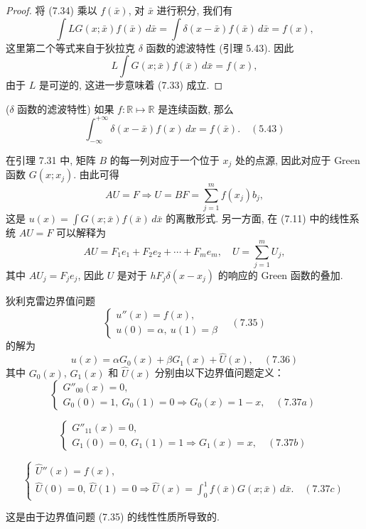 \documentclass[a4paper]{ctexart}
\newcommand{\hl}[1]
{\noindent {\bf {#1}}}
\begin{document}
{\begin{proof}
将 (7.34) 乘以 $f(\bar{x})$, 对 $\bar{x}$ 进行积分, 我们有
$$
\int LG(x; \bar{x})f(\bar{x}) \, d\bar{x} 
= \int \delta(x - \bar{x})f(\bar{x}) \, d\bar{x} = f(x),
$$
这里第二个等式来自于狄拉克 $\delta$ 函数的滤波特性 (引理 5.43). 因此
$$
L \int G(x; \bar{x})f(\bar{x}) \, d\bar{x} = f(x),
$$
由于 $L$ 是可逆的, 这进一步意味着 (7.33) 成立.
\end{proof}

\hl{引理 5.43} ($\delta$ 函数的滤波特性) 如果 $f: \mathbb{R} \mapsto \mathbb{R}$ 
是连续函数, 那么
$$
\int_{-\infty}^{+\infty} \delta(x - \bar{x})f(x) \, dx = f(\bar{x}). \quad (5.43)
$$

在引理 7.31 中, 矩阵 $B$ 的每一列对应于一个位于 $x_j$ 处的点源, 
因此对应于 Green 函数 $G(x; x_j)$. 由此可得
$$
AU = F \Rightarrow U = BF = \sum_{j = 1}^{m} f(x_j) b_j,
$$
这是 $u(x) = \int G(x; \bar{x})f(\bar{x}) \, d\bar{x}$ 的离散形式. 
另一方面, 在 (7.11) 中的线性系统 $AU = F$ 可以解释为
$$
AU = F_1 e_1 + F_2 e_2 + \cdots + F_m e_m, \quad U = \sum_{j = 1}^{m} U_j,
$$
其中 $AU_j = F_je_j$, 因此 $U$ 是对于 $hF_j \delta(x - x_j)$ 的响应的 
Green 函数的叠加. 

\hl{定理 7.34} 狄利克雷边界值问题
$$
\begin{cases}
u''(x) = f(x), \\
u(0) = \alpha, \ u(1) = \beta
\end{cases} \quad (7.35)
$$
的解为
$$
u(x) = \alpha G_0(x) + \beta G_1(x) + \hat{U}(x), \quad (7.36)
$$
其中 $G_0(x)$, $G_1(x)$ 和 $\hat{U}(x)$ 分别由以下边界值问题定义：
$$
\begin{cases}
G''_{00}(x) = 0, \\
G_0(0) = 1, \ G_0(1) = 0 \Rightarrow G_0(x) = 1 - x, \quad (7.37a)
\end{cases}
$$

$$
\begin{cases}
G''_{11}(x) = 0, \\
G_1(0) = 0, \ G_1(1) = 1 \Rightarrow G_1(x) = x, \quad (7.37b)
\end{cases}
$$

$$
\begin{cases}
\hat{U}''(x) = f(x), \\
\hat{U}(0) = 0, \ \hat{U}(1) = 0 \Rightarrow \hat{U}(x) 
= \int_{0}^{1} f(\bar{x})G(x; \bar{x}) \, d\bar{x}. \quad (7.37c)
\end{cases}
$$

这是由于边界值问题 (7.35) 的线性性质所导致的.

}
\end{document}
